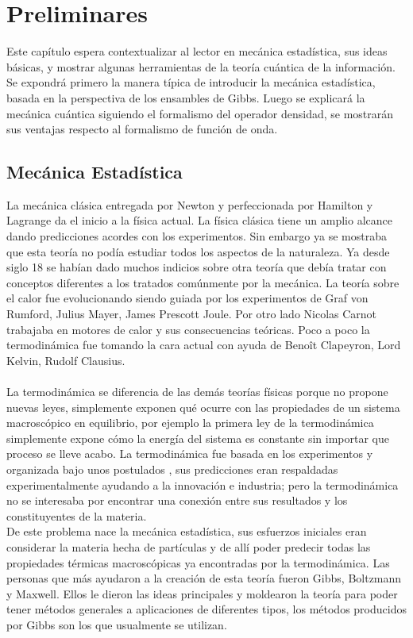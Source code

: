 \chapter{Preliminares}

Este capítulo espera contextualizar al lector en mecánica estadística, sus ideas básicas, y mostrar algunas herramientas de la teoría cuántica de la información. Se expondrá  primero la manera típica de introducir la mecánica estadística, basada en la perspectiva de los ensambles de Gibbs. Luego se explicará la mecánica cuántica siguiendo el formalismo del operador densidad, se mostrarán sus ventajas respecto al formalismo de función de onda.


\section{Mecánica Estadística}
La mecánica clásica entregada por Newton y perfeccionada por Hamilton y Lagrange da el inicio a la física actual. La física clásica tiene un amplio alcance dando predicciones acordes con los experimentos. Sin embargo ya se mostraba que esta teoría no podía estudiar todos los aspectos de la naturaleza. Ya desde siglo 18 se habían dado muchos indicios sobre otra teoría que debía tratar con conceptos diferentes a los tratados comúnmente por la mecánica. La teoría sobre el calor fue evolucionando siendo guiada por los experimentos de Graf von Rumford, Julius Mayer, James Prescott Joule. Por otro lado Nicolas Carnot trabajaba en motores de calor y sus consecuencias teóricas. Poco a poco la termodinámica fue tomando la cara actual con ayuda de Benoît Clapeyron, Lord Kelvin, Rudolf Clausius. 
\\
\\
La termodinámica se diferencia de las demás teorías físicas porque no propone nuevas leyes, simplemente exponen qué ocurre con las propiedades de un sistema macroscópico en equilibrio, por ejemplo la primera ley de la termodinámica simplemente expone cómo la energía del sistema es constante sin importar que proceso se lleve acabo. La termodinámica fue basada en los experimentos y organizada bajo unos postulados \cite{CallenThermo}, sus predicciones eran respaldadas experimentalmente ayudando a la innovación e industria; pero la termodinámica no se interesaba por encontrar una conexión entre sus resultados y los constituyentes de la materia.\\
De este problema nace la mecánica estadística, sus esfuerzos iniciales eran considerar la materia hecha de partículas y de allí poder predecir todas las propiedades térmicas macroscópicas ya encontradas por la termodinámica. Las personas que más ayudaron a la creación de esta teoría fueron Gibbs, Boltzmann y Maxwell. Ellos le dieron las ideas principales y moldearon la teoría para poder tener métodos generales a aplicaciones de diferentes tipos, los métodos producidos por Gibbs son los que usualmente se utilizan.
